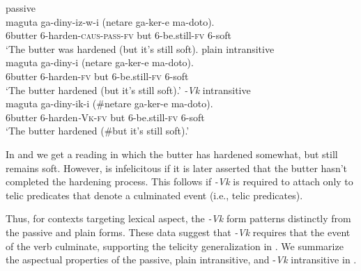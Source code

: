 \documentclass[output=paper]{langsci/lanmgscibook}
\begin{document}
\ea\label{ex:gluckman:15} 
  \ea\label{ex:gluckman:15a}
  {{passive}}\\
  \gll maguta  ga-diny-iz-w-i                     (netare ga-ker-e       ma-doto).\\
      6butter  6-harden-\textsc{caus}-\textsc{pass}-\textsc{fv}       but      6-be.still-\textsc{fv} 6-soft\\
  \glt ‘The butter was hardened (but it’s still soft).
  \ex\label{ex:gluckman:15b}
  {{plain intransitive}}\\
  \gll maguta ga-diny-i      (netare ga-ker-e       ma-doto).\\
      6butter 6-harden-\textsc{fv}   but     6-be.still-\textsc{fv}  6-soft\\
  \glt ‘The butter hardened (but it’s still soft).’
  \ex\label{ex:gluckman:15c}
  {{\textit{-Vk}}{ intransitive}}\\
  \gll maguta ga-diny-ik-i        (\#netare ga-ker-e       ma-doto).\\
      6butter 6-harden\textit{-}\textsc{Vk}-\textsc{fv}     but      6-be.still-\textsc{fv} 6-soft\\
  \glt ‘The butter hardened (\#but it’s still soft).’
  \z
\z

In  and  we get a reading in which the butter has hardened somewhat, but still remains soft. However,  is infelicitous if it is later asserted that the butter hasn’t completed the hardening process. This follows if \textit{-Vk} is required to attach only to telic predicates that denote a culminated event (i.e., telic predicates).

Thus, for contexts targeting lexical aspect, the \textit{-Vk} form patterns distinctly from the passive and plain forms. These data suggest that \textit{-Vk} requires that the event of the verb culminate, supporting the telicity generalization in . We summarize the aspectual properties of the  passive, plain intransitive, and -\textit{Vk} intransitive in . 

\begin{table}
\caption{Lexical aspect properties of passive, plain intransitive and \textit{-Vk} intransitive}
\label{tab:gluckman:3}

\end{table}
\end{document}
